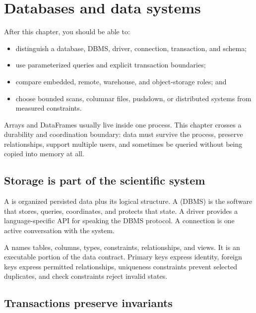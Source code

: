 \chapter{Databases and data systems}
\label{ch:databases}

\begin{learningobjectives}
After this chapter, you should be able to:
\begin{itemize}
  \item distinguish a database, DBMS, driver, connection, transaction, and schema;
  \item use parameterized queries and explicit transaction boundaries;
  \item compare embedded, remote, warehouse, and object-storage roles; and
  \item choose bounded scans, columnar files, pushdown, or distributed systems
  from measured constraints.
\end{itemize}
\end{learningobjectives}

\begin{chapterconnection}
Arrays and DataFrames usually live inside one process. This chapter crosses a
durability and coordination boundary: data must survive the process, preserve
relationships, support multiple users, and sometimes be queried without being
copied into memory at all.
\end{chapterconnection}

\section{Storage is part of the scientific system}

A  is organized persisted data plus its logical structure. A
 (DBMS) is the software that stores, queries,
coordinates, and protects that state. A driver provides a language-specific API
for speaking the DBMS protocol. A connection is one active conversation with
the system.

A  names tables, columns, types, constraints, relationships, and
views. It is an executable portion of the data contract. Primary keys express
identity, foreign keys express permitted relationships, uniqueness constraints
prevent selected duplicates, and check constraints reject invalid states.

\section{Transactions preserve invariants}

